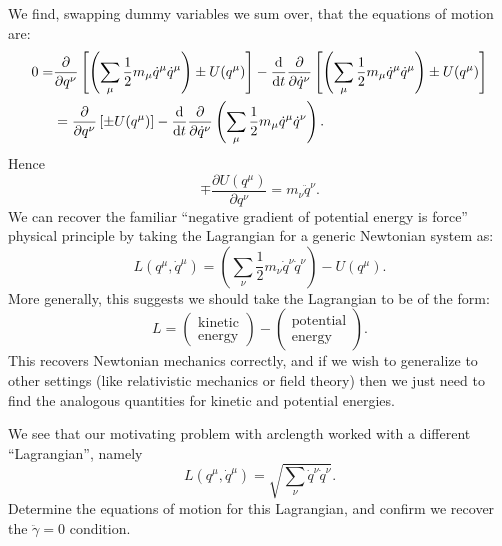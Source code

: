 We find, swapping dummy variables we sum over, that the equations of
motion are:
\begin{equation}
\begin{split}
0 = &\frac{\partial}{\partial q^{\nu}}\left[\left(\sum_{\mu}\frac{1}{2}m_{\mu}\dot{q}^{\mu}\dot{q}^{\mu}\right) \pm U(q^{\mu})\right]
-\frac{\mathrm{d}}{\mathrm{d} t}\frac{\partial }{\partial \dot{q}^{\nu}}\left[\left(\sum_{\mu}\frac{1}{2}m_{\mu}\dot{q}^{\mu}\dot{q}^{\mu}\right) \pm U(q^{\mu})\right]\\
&= 
\frac{\partial}{\partial q^{\nu}}\left[\pm U(q^{\mu})\right]
-\frac{\mathrm{d}}{\mathrm{d} t}\frac{\partial }{\partial \dot{q}^{\nu}}\left(\sum_{\mu}\frac{1}{2}m_{\mu}\dot{q}^{\mu}\dot{q}^{\nu}\right).
\end{split}
\end{equation}
Hence
\begin{equation}
\mp\frac{\partial U(q^{\mu})}{\partial q^{\nu}} = m_{\nu}\ddot{q}^{\nu}.
\end{equation}
We can recover the familiar ``negative gradient of potential energy is
force'' physical principle by taking the Lagrangian for a generic
Newtonian system as:
\begin{equation}
\boxed{L(q^{\mu}, \dot{q}^{\mu}) =
\left(\sum_{\nu}\frac{1}{2}m_{\nu}\dot{q}^{\nu}\dot{q}^{\nu}\right) - U(q^{\mu}).}
\end{equation}
More generally, this suggests we should take the Lagrangian to be of the form:
\begin{equation}
L = \begin{pmatrix}\mbox{kinetic}\\\mbox{energy}\end{pmatrix}
-\begin{pmatrix}\mbox{potential}\\\mbox{energy}\end{pmatrix}.
\end{equation}
This recovers Newtonian mechanics correctly, and if we wish to
generalize to other settings (like relativistic mechanics or field theory) then we just
need to find the analogous quantities for kinetic and potential
energies.

We see that our motivating problem with arclength worked with a
different ``Lagrangian'', namely
\begin{equation}
L(q^{\mu},\dot{q}^{\mu}) = \sqrt{\sum_{\nu}\dot{q}^{\nu}\dot{q}^{\nu}}.
\end{equation}
Determine the equations of motion for this Lagrangian, and confirm we
recover the $\ddot\gamma=0$ condition.

